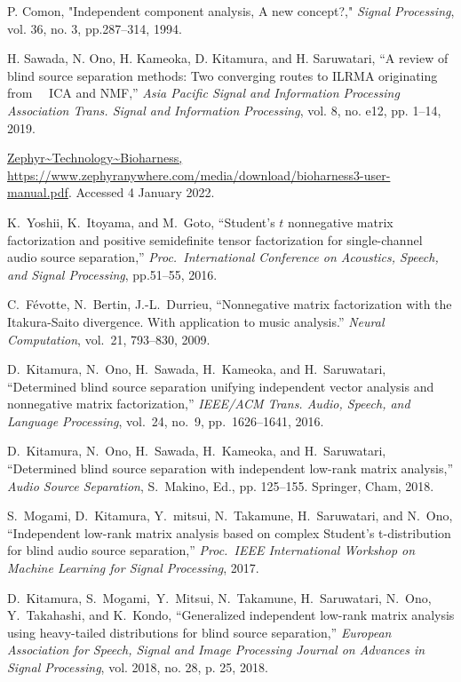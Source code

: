 \documentclass[a4j]{jsarticle}
\begin{document}
\begin{thebibliography}{99}%
\itemsep 3pt %
\fontsize{8pt}{10pt}\selectfont  %

P. Comon, "Independent component analysis, A new concept?," {\em Signal Processing}, vol. 36, no. 3, pp.287--314, 1994.

H. Sawada, N. Ono, H. Kameoka, D. Kitamura, and H. Saruwatari, ``A review of
blind source separation methods: Two converging routes to ILRMA originating from　
ICA and NMF,'' {\em Asia Pacific Signal and Information Processing Association Trans. Signal and Information Processing}, vol. 8, no. e12,
pp. 1–14, 2019.

\url{Zephyr~Technology~Bioharness, https://www.zephyranywhere.com/media/download/bioharness3-user-manual.pdf}. Accessed 4 January 2022.

K.~Yoshii, K.~Itoyama, and M.~Goto, ``Student's $t$ nonnegative matrix factorization and positive semidefinite tensor    
factorization for single-channel audio source separation,''
{\em Proc.~International Conference on Acoustics, Speech, and Signal Processing}, pp.51--55, 2016.

C.~Févotte, N.~Bertin, J.-L.~Durrieu, 
``Nonnegative matrix factorization with the Itakura-Saito divergence. With application to music analysis.'' 
{\em Neural Computation}, vol.~21, 793--830, 2009.

D.~Kitamura, N.~Ono, H.~Sawada, H.~Kameoka, and H.~Saruwatari,
``Determined blind source separation unifying independent vector analysis and nonnegative matrix factorization,'' 
{\em IEEE/ACM Trans. Audio, Speech, and Language Processing}, vol.~24, no.~9, pp.~1626--1641, 2016.

D.~Kitamura, N.~Ono, H.~Sawada, H.~Kameoka, and H.~Saruwatari, ``Determined blind source separation with independent low-rank matrix analysis,'' 
{\em Audio Source Separation}, S.~Makino, Ed., pp. 125--155. Springer, Cham, 2018.

S.~Mogami, D.~Kitamura, Y.~mitsui, N.~Takamune, H.~Saruwatari, and N.~Ono, ``Independent low-rank matrix analysis based on complex Student's t-distribution for blind audio source     separation,''
{\em Proc.~IEEE International Workshop on Machine Learning for Signal Processing}, 2017. 
 
D.~Kitamura, S.~Mogami,~Y.~Mitsui, N.~Takamune, H.~Saruwatari, N.~Ono, Y.~Takahashi, and K.~Kondo, 
``Generalized independent low-rank matrix analysis using heavy-tailed distributions for blind source separation,''
{\em European Association for Speech, Signal and Image Processing Journal on Advances in Signal Processing}, vol. 2018, no. 28, p. 25, 2018. 

\end{thebibliography}
\end{document}
